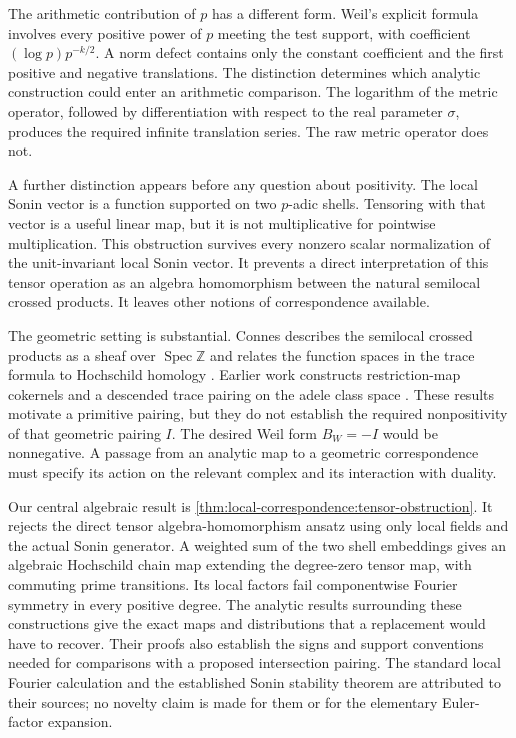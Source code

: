 \documentclass[11pt,letterpaper]{article}
\theoremstyle{definition}
\theoremstyle{remark}
\newcommand{\Z}{\mathbb Z}
\begin{document}
The arithmetic contribution of $p$ has a different form. Weil's explicit
formula involves every positive power of $p$ meeting the test support,
with coefficient $(\log p)p^{-k/2}$. A norm defect contains only the
constant coefficient and the first positive and negative translations.
The distinction determines which analytic construction could enter an
arithmetic comparison. The logarithm of the metric operator, followed by
differentiation with respect to the real parameter $\sigma$, produces the required infinite
translation series. The raw metric operator does not.

A further distinction appears before any question about positivity.
The local Sonin vector is a function supported on two $p$-adic shells.
Tensoring with that vector is a useful linear map, but it is not
multiplicative for pointwise multiplication. This obstruction survives
every nonzero scalar normalization of the unit-invariant local Sonin
vector. It prevents a direct interpretation of this tensor operation
as an algebra homomorphism between the natural semilocal crossed products.
It leaves other notions of correspondence available.

The geometric setting is substantial. Connes describes the semilocal
crossed products as a sheaf over $\operatorname{Spec}\Z$ and relates the
function spaces in the trace formula to Hochschild homology
\cite[Section 7.3, Theorem 7.2]{Connes2026}. Earlier work constructs
restriction-map cokernels and a descended trace pairing on the adele
class space \cite[Sections 4 and 5]{CCMar}. These results motivate a
primitive pairing, but they do not establish the required nonpositivity
of that geometric pairing $I$. The desired Weil form $B_W=-I$ would
be nonnegative. A passage from an analytic
map to a geometric correspondence must specify its action on the
relevant complex and its interaction with duality.

Our central algebraic result is
\cref{thm:local-correspondence:tensor-obstruction}. It rejects the direct
tensor algebra-homomorphism ansatz using only local fields and the actual
Sonin generator. A weighted sum of the two shell embeddings gives
an algebraic Hochschild chain map extending the degree-zero tensor
map, with commuting prime transitions. Its local factors fail
componentwise Fourier symmetry in every positive degree. The analytic
results surrounding these constructions give the exact maps
and distributions that a replacement would have to recover. Their proofs
also establish the signs and support conventions needed for comparisons
with a proposed intersection pairing. The standard local Fourier
calculation and the established Sonin stability theorem are attributed
to their sources; no novelty claim is made for them or for the elementary
Euler-factor expansion.
\end{document}
